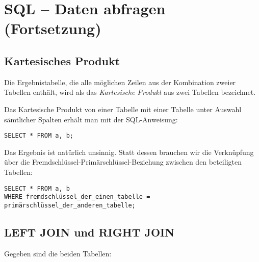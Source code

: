 \clearpage

\rehead[]{\textcolor{lightblue}{AvHG, Inf, My}}
\lohead[]{\textcolor{lightblue}{AvHG, Inf, My}}

\section[\hspace{1mm} SQL -- Daten abfragen (Fortsetzung)]{SQL -- Daten abfragen (Fortsetzung)}

\subsection{Kartesisches Produkt}

Die Ergebnistabelle, die alle möglichen Zeilen aus der Kombination zweier
Tabellen enthält, wird als das \textit{Kartesische Produkt} aus zwei Tabellen
bezeichnet.

Das Kartesische Produkt von einer Tabelle  mit einer Tabelle
 unter Auswahl sämtlicher Spalten erhält man mit der
SQL-Anweisung:

\begin{lstlisting}
SELECT * FROM a, b;
\end{lstlisting}

Das Ergebnis ist natürlich unsinnig. Statt dessen brauchen wir die Verknüpfung
über die Fremdschlüssel-Primärschlüssel-Beziehung zwischen den beteiligten
Tabellen:

\begin{lstlisting}
SELECT * FROM a, b
WHERE fremdschlüssel_der_einen_tabelle = primärschlüssel_der_anderen_tabelle;
\end{lstlisting}


\subsection{LEFT JOIN und RIGHT JOIN}

Gegeben sind die beiden Tabellen:

